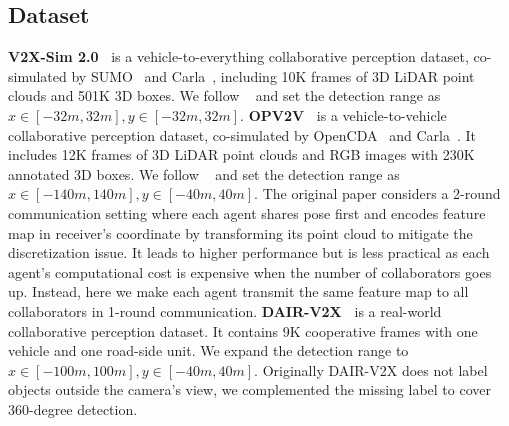 \documentclass[letterpaper, 10 pt, conference]{ieeeconf}  %
\begin{document}
\subsection{Dataset}
\textbf{V2X-Sim 2.0~\cite{Li_2021_RAL}} is a vehicle-to-everything collaborative perception dataset, co-simulated by SUMO~\cite{krajzewicz2012recent} and Carla~\cite{dosovitskiy2017carla}, including 10K frames of 3D LiDAR point clouds and 501K 3D boxes. 
We follow ~\cite{Li_2021_RAL} and set the detection range as $x\in [-32m,32m],  y \in [-32m, 32m]$. \textbf{OPV2V~\cite{xu2022opv2v}} is a vehicle-to-vehicle collaborative perception dataset, co-simulated by OpenCDA~\cite{xu2021opencda} and Carla~\cite{dosovitskiy2017carla}. It includes 12K frames of 3D LiDAR point clouds and RGB images with 230K annotated 3D boxes. We follow ~\cite{xu2022opv2v} and set the detection range as $x\in [-140m, 140m], y\in[-40m, 40m]$. The original paper considers a 2-round communication setting where each agent shares pose first and encodes feature map in receiver's coordinate by transforming its point cloud to mitigate the discretization issue. It leads to higher performance but is less practical as each agent's computational cost is expensive when the number of collaborators goes up. Instead, here we make each agent transmit the same feature map to all collaborators in 1-round communication. \textbf{DAIR-V2X~\cite{yu2022dairv2x}} is a real-world collaborative perception dataset. It contains 9K cooperative frames with one vehicle and one road-side unit. We expand the detection range to $x\in [-100 m, 100m], y\in[-40m, 40m]$. Originally DAIR-V2X does not label objects outside the camera's view, we complemented the missing label to cover 360-degree detection.

\vspace{-1mm}
\end{document}

